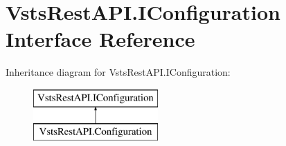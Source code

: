 \hypertarget{interface_vsts_rest_a_p_i_1_1_i_configuration}{}\section{Vsts\+Rest\+A\+P\+I.\+I\+Configuration Interface Reference}
\label{interface_vsts_rest_a_p_i_1_1_i_configuration}
Inheritance diagram for Vsts\+Rest\+A\+P\+I.\+I\+Configuration\+:\begin{figure}[H]
\begin{center}
\leavevmode
\includegraphics[height=2.000000cm]{interface_vsts_rest_a_p_i_1_1_i_configuration}
\end{center}
\end{figure}
